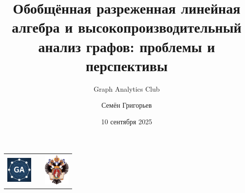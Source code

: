 \documentclass[xcolor=table,aspectratio=169]{beamer}
\title[GraphBLAS: проблемы и перспективы]{Обобщённая разреженная линейная алгебра и высокопроизводительный анализ графов: проблемы и перспективы}
\subtitle{Graph Analytics Club}
\institute[СПбГУ]{
Санкт-Петербургский Государственный Университет
}
\author[Семён Григорьев]{Семён Григорьев}
\date{10 сентября 2025}
\begin{document}
{
\begin{frame}[fragile]
  \begin{table}
  \centering
  \begin{tabularx}{\linewidth}{XcX}
    \includegraphics[height=1.3cm]{pictures/GAC_logo.jpg} 
    \hfill
    & 
    & \hfill \includegraphics[height=1.6cm]{pictures/SPbGU_Logo.png}
  \end{tabularx}
  \end{table}
  \titlepage
\end{frame}
}
\end{document}
